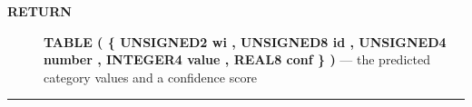 \par
\begin{description}
\item [\colorbox{tagtype}{\color{white} \textbf{\textsf{RETURN}}}] \textbf{TABLE ( \{ UNSIGNED2 wi , UNSIGNED8 id , UNSIGNED4 number , INTEGER4 value , REAL8 conf \} )} --- the predicted category values and a confidence score
\end{description}




\rule{\linewidth}{0.5pt}
